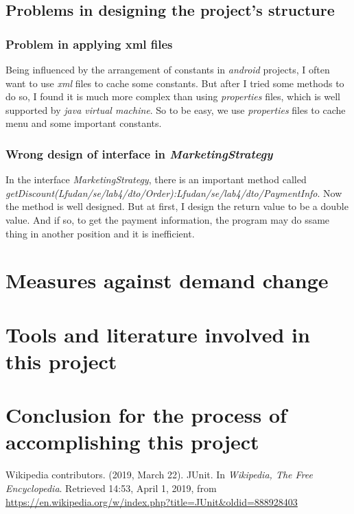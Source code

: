 \documentclass[a4paper]{report}
\begin{document}
\section{Problems in designing the project's structure}
\subsection{Problem in applying xml files}
\par Being influenced by the arrangement of constants in \emph{android} projects, I often want to use \emph{xml} files to cache some constants. But after I tried some methods to do so, I found it is much more complex than using \emph{properties} files, which is well supported by \emph{java virtual machine}. So to be easy, we use \emph{properties} files to cache menu and some important constants.
\subsection{Wrong design of interface in \emph{MarketingStrategy}}
\par In the interface \emph{MarketingStrategy}, there is an important method called \emph{getDiscount(Lfudan/se/lab4/dto/Order):Lfudan/se/lab4/dto/PaymentInfo}. Now the method is well designed. But at first, I design the return value to be a double value. And if so, to get the payment information, the program may do ssame thing in another position and it is inefficient.
\chapter{Measures against demand change}



\chapter{Tools and literature involved in this project}



\chapter{Conclusion for the process of accomplishing this project}


\begin{thebibliography}{A}


Wikipedia contributors. (2019, March 22). JUnit. In \emph{Wikipedia, The Free Encyclopedia}. Retrieved 14:53, April 1, 2019, from \url{https://en.wikipedia.org/w/index.php?title=JUnit&oldid=888928403}

\end{thebibliography}
\end{document}
